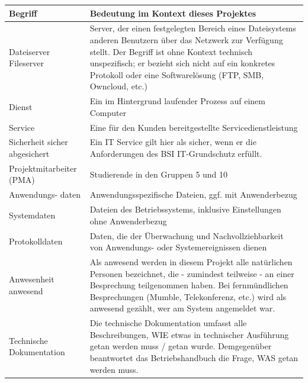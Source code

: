 \begin{minipage}{\textwidth}
\begin{center}
\begin{tabular}{p{3.2cm}p{12cm}}
\toprule
Begriff & Bedeutung im Kontext dieses Projektes \\
\midrule
Dateiserver \newline Fileserver & Server, der einen festgelegten Bereich eines Dateisystems anderen Benutzern über das Netzwerk zur Verfügung stellt. Der Begriff ist ohne Kontext technisch unspezifisch; er bezieht sich nicht auf ein konkretes Protokoll oder eine Softwarelösung (FTP, SMB, Owncloud, etc.) \\
\midrule
Dienst & Ein im Hintergrund laufender Prozess auf einem Computer \\
\midrule
Service & Eine für den Kunden bereitgestellte Servicedienstleistung \\
\midrule
Sicherheit \newline sicher \newline abgesichert & Ein IT Service gilt hier als sicher, wenn er die Anforderungen des BSI IT-Grundschutz erfüllt. \\
\midrule
Projektmitarbeiter \newline (PMA) & Studierende in den Gruppen 5 und 10 \\
\midrule
Anwendungs- \newline daten & Anwendungsspezifische Dateien, ggf. mit Anwenderbezug \\
\midrule
Systemdaten & Dateien des Betriebssystems, inklusive Einstellungen ohne Anwenderbezug \\
\midrule
Protokolldaten & Daten, die der Überwachung und Nachvollziehbarkeit von Anwendungs- oder Systemereignissen dienen \\
\midrule
Anwesenheit \newline anwesend & Als anwesend werden in diesem Projekt alle natürlichen Personen bezeichnet, die - zumindest teilweise - an einer Besprechung teilgenommen haben. Bei fernmündlichen Besprechungen (Mumble, Telekonferenz, etc.) wird als anwesend gezählt, wer am System angemeldet war. \\
\midrule
Technische \newline Dokumentation & Die technische Dokumentation umfasst alle Beschreibungen, WIE etwas in technischer Ausführung getan werden muss / getan wurde. Demgegenüber beantwortet das Betriebshandbuch die Frage, WAS getan werden muss. \\
\bottomrule
\end{tabular}
\end{center}
\end{minipage}


\newpage
\printbibliography


